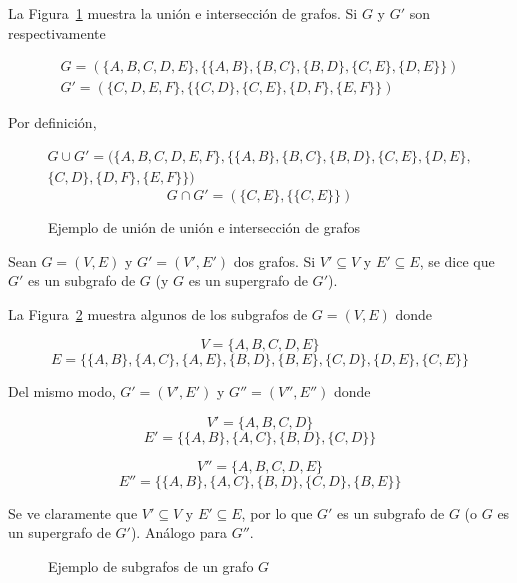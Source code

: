 \begin{ejemplo}
	La Figura~\ref{fig:union_interseccion_grafo} muestra la unión e intersección de grafos. Si $G$ y $G'$ son respectivamente 
	
	\begin{eqnarray*}
		G = (\{A, B, C, D, E\}, \{ \{A,B\}, \{B,C\}, \{B,D\}, \{C,E\}, \{D, E\} \})\\
		G' = (\{C, D, E, F\}, \{ \{C,D\}, \{C,E\}, \{D,F\}, \{E,F\} \})
	\end{eqnarray*}
	
	Por definición,
	
	\begin{multline*}
	G \cup G' = (\{A, B, C, D, E, F\}, \{ \{A,B\}, \{B,C\}, \{B,D\}, \{C,E\}, \{D, E\}, \\
	\{C,D\}, \{D,F\},\{E,F\} \})
	\end{multline*}
	\[G \cap G' = (\{C, E\}, \{\{C,E\}\})\]
	
	
	\begin{figure}[htb]
		\centering
		\ejemplounionintersecciongrafo
		\caption{Ejemplo de unión de unión e intersección de grafos}
		\label{fig:union_interseccion_grafo}
	\end{figure}
	
\end{ejemplo}

\begin{defi}
	
	Sean $G = (V,E)$ y $G' = (V',E')$ dos grafos. Si $V' \subseteq V$ y $E' \subseteq E$, se dice que $G'$ es un subgrafo de $G$ (y $G$ es un supergrafo de $G'$).
	
\end{defi}

\begin{ejemplo}
	La Figura~\ref{fig:subgrafo} muestra algunos de los subgrafos de $G= (V,E)$ donde
	
	\[ V  = \{A, B, C, D, E\}\]
	\[E = \{ \{A,B\}, \{A,C\}, \{A,E\}, \{B,D\}, \{B, E\},\{C,D\}, \{D,E\},\{C,E\} \} \]
	
	Del mismo modo, $G' = (V', E')$ y $G'' = (V'', E'')$ donde
	
	\[ V'  = \{A, B, C, D\}\]
	\[E' = \{ \{A,B\}, \{A,C\}, \{B,D\},\{C,D\} \} \]
	
	\[ V''  = \{A, B, C, D, E\}\]
	\[E'' = \{ \{A,B\}, \{A,C\}, \{B,D\},\{C,D\},\{B,E\} \} \]
	
	Se ve claramente que $V' \subseteq V$ y $E' \subseteq E$, por lo que $G'$ es un subgrafo de $G$ (o $G$ es un supergrafo de $G'$). Análogo para $G''$.
	
	
	\begin{figure}[htb]
		\centering
		\ejemplosubgrafo
		\caption[Ejemplo de subgrafos de un grafo]{Ejemplo de subgrafos de un grafo $G$}
		\label{fig:subgrafo}
	\end{figure}
	
\end{ejemplo}

